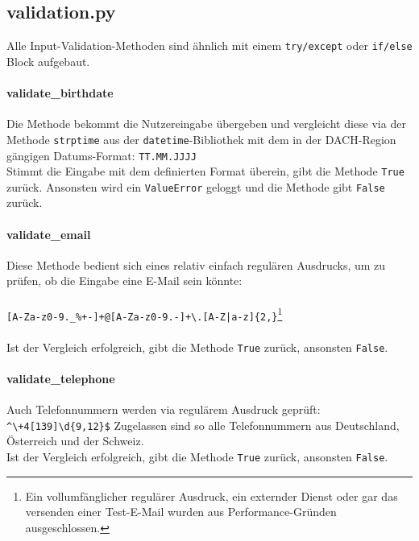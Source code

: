         \subsection{validation.py} \label{validation.py}
            Alle Input-Validation-Methoden sind ähnlich mit einem \verb|try/except| oder \verb|if/else| Block aufgebaut.

            \paragraph{validate\_birthdate}
                Die Methode bekommt die Nutzereingabe übergeben und vergleicht diese via der Methode \verb|strptime| aus der \verb|datetime|-Bibliothek \cite{datetime} mit dem in der DACH-Region gängigen Datums-Format: \verb|TT.MM.JJJJ| \\
                Stimmt die Eingabe mit dem definierten Format überein, gibt die Methode \verb|True| zurück. Ansonsten wird ein \verb|ValueError| geloggt und die Methode gibt \verb|False| zurück.

            \paragraph{validate\_email}
                Diese Methode bedient sich eines relativ einfach regulären Ausdrucks, um zu prüfen, ob die Eingabe eine E-Mail sein könnte: \\
                \\
                \verb/[A-Za-z0-9._%+-]+@[A-Za-z0-9.-]+\.[A-Z|a-z]{2,}/\footnote{Ein vollumfänglicher regulärer Ausdruck, ein externder Dienst oder gar das versenden einer Test-E-Mail wurden aus Performance-Gründen ausgeschlossen.} \\ 
                \\
                Ist der Vergleich erfolgreich, gibt die Methode \verb|True| zurück, ansonsten \verb|False|.

            \paragraph{validate\_telephone}
                Auch Telefonnummern werden via regulärem Ausdruck geprüft: \verb/^\+4[139]\d{9,12}$/
                Zugelassen sind so alle Telefonnummern aus Deutschland, Österreich und der Schweiz.\\
                Ist der Vergleich erfolgreich, gibt die Methode \verb|True| zurück, ansonsten \verb|False|.

